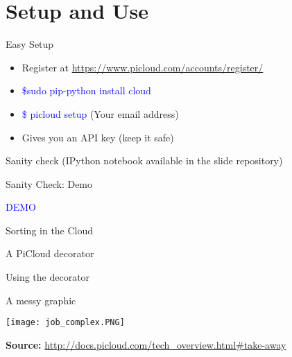 \documentclass{beamer} \usepackage{fancyvrb} \usepackage{listings}
\begin{document}
    \section{Setup and Use}

    \begin{frame}{Easy Setup}
      \begin{itemize}
      \item Register at
        \url{https://www.picloud.com/accounts/register/}
      \item \textcolor{blue}{\$sudo pip-python install cloud}
      \item \textcolor{blue}{\$ picloud setup} (Your email address)
      \item Gives you an API key (keep it safe)
      \end{itemize}

    \end{frame}

    \begin{frame}{Sanity check}
      \centering(IPython notebook available in the slide repository)
      
      
    \end{frame}

    \begin{frame}{Sanity Check: Demo}
      \begin{center}
        \textcolor{blue}{DEMO}
      \end{center}
    \end{frame}
    

    \begin{frame}{Sorting in the Cloud}
      
      
    \end{frame}

    \begin{frame}{A PiCloud decorator}
      
      
    \end{frame}

    \begin{frame}{Using the decorator}
      
      
    \end{frame}

    \begin{frame}{A messy graphic}
        \begin{center}
          \texttt{[image: job\_complex.PNG]}
        \end{center}
        \textbf{Source:} \url{http://docs.picloud.com/tech_overview.html\#take-away}
      \end{frame}
\end{document}
